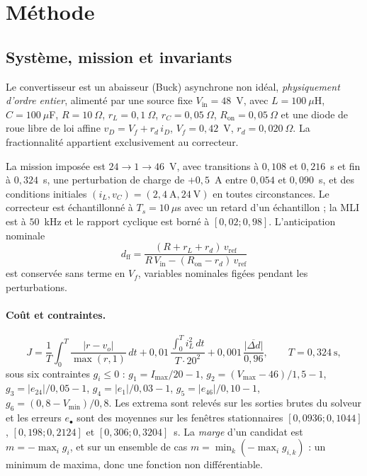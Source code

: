 \section{Méthode}
\label{sec:methode}

\subsection{Système, mission et invariants}
\label{sec:systeme}

Le convertisseur est un abaisseur (Buck) asynchrone non idéal, \emph{physiquement
d'ordre entier}, alimenté par une source fixe $V_\mathrm{in}=48$~V, avec
$L=100~\mu$H, $C=100~\mu$F, $R=10~\Omega$, $r_L=0{,}1~\Omega$, $r_C=0{,}05~\Omega$,
$R_\mathrm{on}=0{,}05~\Omega$ et une diode de roue libre de loi affine
$v_D=V_f+r_d\,i_D$, $V_f=0{,}42$~V, $r_d=0{,}020~\Omega$. La fractionnalité
appartient exclusivement au correcteur.

La mission imposée est $24\to1\to46$~V, avec transitions à $0{,}108$ et
$0{,}216$~s et fin à $0{,}324$~s, une perturbation de charge de $+0{,}5$~A entre
$0{,}054$ et $0{,}090$~s, et des conditions initiales $(i_L,v_C)=(2{,}4~\mathrm{A},
24~\mathrm{V})$ en toutes circonstances. Le correcteur est échantillonné à
$T_s=10~\mu$s avec un retard d'un échantillon ; la MLI est à $50$~kHz et le
rapport cyclique est borné à $[0{,}02;0{,}98]$. L'anticipation nominale
\begin{equation}
d_\mathrm{ff}=\frac{(R+r_L+r_d)\,v_\mathrm{ref}}{R\,V_\mathrm{in}-(R_\mathrm{on}-r_d)\,v_\mathrm{ref}}
\label{eq:dff}
\end{equation}
est conservée sans terme en $V_f$, variables nominales figées pendant les
perturbations.

\paragraph{Coût et contraintes.}
\begin{equation}
J=\frac{1}{T}\!\int_0^T\!\frac{|r-v_o|}{\max(r,1)}\,dt
+0{,}01\,\frac{\int_0^T i_L^2\,dt}{T\cdot 20^2}
+0{,}001\,\frac{\overline{|\Delta d|}}{0{,}96},\qquad T=0{,}324~\mathrm{s},
\end{equation}
sous six contraintes $g_i\le0$ :
$g_1=I_\mathrm{max}/20-1$,
$g_2=(V_\mathrm{max}-46)/1{,}5-1$,
$g_3=|e_{24}|/0{,}05-1$,
$g_4=|e_{1}|/0{,}03-1$,
$g_5=|e_{46}|/0{,}10-1$,
$g_6=(0{,}8-V_\mathrm{min})/0{,}8$.
Les extrema sont relevés sur les sorties brutes du solveur et les erreurs
$e_\bullet$ sont des moyennes sur les fenêtres stationnaires
$[0{,}0936;0{,}1044]$, $[0{,}198;0{,}2124]$ et $[0{,}306;0{,}3204]$~s. La
\emph{marge} d'un candidat est $m=-\max_i g_i$, et sur un ensemble de cas
$m=\min_k(-\max_i g_{i,k})$ : un minimum de maxima, donc une fonction
non différentiable.


